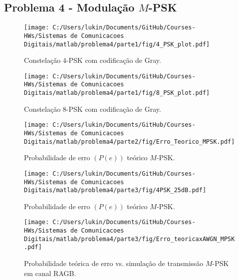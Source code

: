 \subsection{Problema 4 - Modulação \texorpdfstring{$M$}{M}-PSK}

\begin{figure}[!ht]
    \centering
    \texttt{[image: C:/Users/lukin/Documents/GitHub/Courses-HWs/Sistemas de Comunicacoes Digitais/matlab/problema4/parte1/fig/4\_PSK\_plot.pdf]}
    \caption{Constelação $4$-PSK com codificação de Gray.}
    \label{fig:4_PSK_plot}
\end{figure}

\begin{figure}[!ht]
    \centering
    \texttt{[image: C:/Users/lukin/Documents/GitHub/Courses-HWs/Sistemas de Comunicacoes Digitais/matlab/problema4/parte1/fig/8\_PSK\_plot.pdf]}
    \caption{Constelação $8$-PSK com codificação de Gray.}
    \label{fig:8_PSK_plot}
\end{figure}

\begin{figure}[!ht]
    \centering
    \texttt{[image: C:/Users/lukin/Documents/GitHub/Courses-HWs/Sistemas de Comunicacoes Digitais/matlab/problema4/parte2/fig/Erro\_Teorico\_MPSK.pdf]}
    \caption{Probabilidade de erro $(P(e))$ teórico $M$-PSK.}
    \label{fig:Erro_Teorico_MPSK}
\end{figure}


\begin{figure}[!ht]
    \centering
    \texttt{[image: C:/Users/lukin/Documents/GitHub/Courses-HWs/Sistemas de Comunicacoes Digitais/matlab/problema4/parte3/fig/4PSK\_25dB.pdf]}
    \caption{Probabilidade de erro $(P(e))$ teórico $M$-PSK.}
    \label{fig:4PSK_25dB}
\end{figure}

\begin{figure}[!ht]
    \centering
    \texttt{[image: C:/Users/lukin/Documents/GitHub/Courses-HWs/Sistemas de Comunicacoes Digitais/matlab/problema4/parte3/fig/Erro\_teoricaxAWGN\_MPSK.pdf]}
    \caption{Probabilidade teórica de erro vs. simulação de transmissão $M$-PSK em canal RAGB.}
    \label{fig:Erro_teoricaxAWGN_MPSK}
\end{figure}

